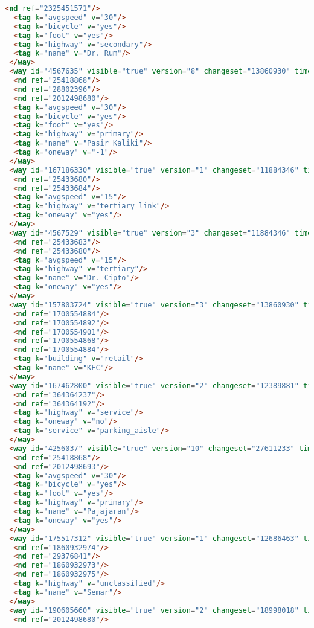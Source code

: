 \begin{lstlisting}[language=HTML,basicstyle=\tiny,caption=bandung1.xml]
  <nd ref="2325451571"/>
  <tag k="avgspeed" v="30"/>
  <tag k="bicycle" v="yes"/>
  <tag k="foot" v="yes"/>
  <tag k="highway" v="secondary"/>
  <tag k="name" v="Dr. Rum"/>
 </way>
 <way id="4567635" visible="true" version="8" changeset="13860930" timestamp="2012-11-13T15:42:43Z" user="yudiwbs" uid="268765">
  <nd ref="25418868"/>
  <nd ref="28802396"/>
  <nd ref="2012498680"/>
  <tag k="avgspeed" v="30"/>
  <tag k="bicycle" v="yes"/>
  <tag k="foot" v="yes"/>
  <tag k="highway" v="primary"/>
  <tag k="name" v="Pasir Kaliki"/>
  <tag k="oneway" v="-1"/>
 </way>
 <way id="167186330" visible="true" version="1" changeset="11884346" timestamp="2012-06-13T12:22:01Z" user="andryono" uid="643030">
  <nd ref="25433680"/>
  <nd ref="25433684"/>
  <tag k="avgspeed" v="15"/>
  <tag k="highway" v="tertiary_link"/>
  <tag k="oneway" v="yes"/>
 </way>
 <way id="4567529" visible="true" version="3" changeset="11884346" timestamp="2012-06-13T12:22:06Z" user="andryono" uid="643030">
  <nd ref="25433683"/>
  <nd ref="25433680"/>
  <tag k="avgspeed" v="15"/>
  <tag k="highway" v="tertiary"/>
  <tag k="name" v="Dr. Cipto"/>
  <tag k="oneway" v="yes"/>
 </way>
 <way id="157803724" visible="true" version="3" changeset="13860930" timestamp="2012-11-13T15:47:32Z" user="yudiwbs" uid="268765">
  <nd ref="1700554884"/>
  <nd ref="1700554892"/>
  <nd ref="1700554901"/>
  <nd ref="1700554868"/>
  <nd ref="1700554884"/>
  <tag k="building" v="retail"/>
  <tag k="name" v="KFC"/>
 </way>
 <way id="167462800" visible="true" version="2" changeset="12389881" timestamp="2012-07-20T20:14:38Z" user="OSMF Redaction Account" uid="722137">
  <nd ref="364364237"/>
  <nd ref="364364192"/>
  <tag k="highway" v="service"/>
  <tag k="oneway" v="no"/>
  <tag k="service" v="parking_aisle"/>
 </way>
 <way id="4256037" visible="true" version="10" changeset="27611233" timestamp="2014-12-21T15:25:04Z" user="gnocin" uid="2526082">
  <nd ref="25418868"/>
  <nd ref="2012498693"/>
  <tag k="avgspeed" v="30"/>
  <tag k="bicycle" v="yes"/>
  <tag k="foot" v="yes"/>
  <tag k="highway" v="primary"/>
  <tag k="name" v="Pajajaran"/>
  <tag k="oneway" v="yes"/>
 </way>
 <way id="175517312" visible="true" version="1" changeset="12686463" timestamp="2012-08-11T00:36:04Z" user="ferdyodin" uid="796044">
  <nd ref="1860932974"/>
  <nd ref="29376841"/>
  <nd ref="1860932973"/>
  <nd ref="1860932975"/>
  <tag k="highway" v="unclassified"/>
  <tag k="name" v="Semar"/>
 </way>
 <way id="190605660" visible="true" version="2" changeset="18998018" timestamp="2013-11-19T17:23:36Z" user="ubanovic" uid="1784103">
  <nd ref="2012498680"/>

\end{lstlisting}
